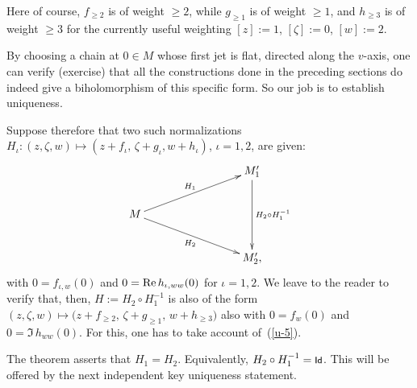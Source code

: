 \documentclass[12pt,twoside,leqno,openany]{amsart}
\begin{document}
Here of course, $f_{\geqslant 2}$ 
is of weight $\geqslant 2$, while $g_{\geqslant 1}$ is of weight
$\geqslant 1$, and $h_{\geqslant 3}$ is
of weight $\geqslant 3$ for the currently useful weighting $[z]
:= 1$, $[\zeta] := 0$, $[w] := 2$.

\proof
By choosing a chain at $0 \in M$ whose first jet is flat,
directed along the $v$-axis, one can verify (exercise) that
all the constructions done in the preceding sections do 
indeed give a biholomorphism of this specific form.
So our job is to establish uniqueness.

\smallskip

Suppose therefore that two such normalizations $H_\iota \colon 
(z,\zeta, w)
\longmapsto (z+f_\iota,\, \zeta+g_\iota, w + h_\iota)$, 
$\iota = 1, 2$, 
are given:
\[
\xymatrix{
& & &
M_1'
\ar[dd]^{H_2\circ H_1^{-1}}
\\
\ar[urrr]^{H_1}
M
\ar[drrr]_{H_2}
\\
& & &
M_2',}
\]
with $0 = f_{\iota,w}(0)$
and $0 = {\rm Re}\, 
h_{\iota,ww}(0)$ for $\iota = 1, 2$.
We leave to the reader to verify
that, then, 
$H := H_2 \circ H_1^{-1}$ is also of the form
$(z, \zeta, w) \longmapsto \big( z + f_{\geqslant 2},\,
\zeta + g_{\geqslant 1},\, w + h_{\geqslant 3} \big)$
also with $0 = f_w(0)$ and $0 = \Im\, h_{ww}(0)$.
For this, one has to take account of~({\ref{u-5}}).

The theorem asserts that $H_1 = H_2$. Equivalently, 
$H_2 \circ H_1^{-1} = \text{\footnotesize{\sf Id}}$. This will be offered by 
the next independent key uniqueness statement.
\endproof
\end{document}
